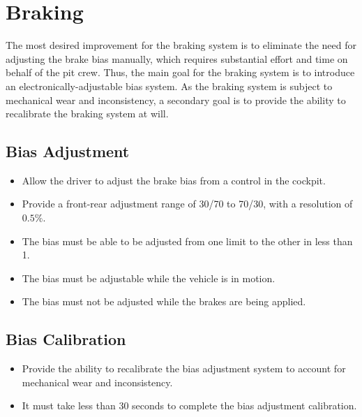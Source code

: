 \section{Braking}

The most desired improvement for the braking system is to eliminate the need for adjusting the brake bias manually, which requires substantial effort and time on behalf of the pit crew. Thus, the main goal for the braking system is to introduce an electronically-adjustable bias system. As the braking system is subject to mechanical wear and inconsistency, a secondary goal is to provide the ability to recalibrate the braking system at will.

\subsection{Bias Adjustment}

\begin{itemize}

\item Allow the driver to adjust the brake bias from a control in the cockpit.
\item Provide a front-rear adjustment range of 30/70 to 70/30, with a resolution of $0.5\%$.
\item The bias must be able to be adjusted from one limit to the other in less than \unit{1}{\second}.
\item The bias must be adjustable while the vehicle is in motion.
\item The bias must not be adjusted while the brakes are being applied.

\end{itemize}

\subsection{Bias Calibration}

\begin{itemize}

\item Provide the ability to recalibrate the bias adjustment system to account for mechanical wear and inconsistency. 
\item It must take less than 30 seconds to complete the bias adjustment calibration.

\end{itemize}
